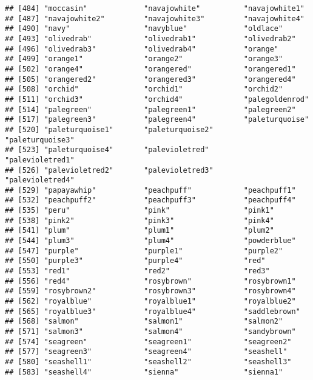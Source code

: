 \documentclass[
]{article}
\begin{document}
\begin{verbatim}
## [484] "moccasin"             "navajowhite"          "navajowhite1"        
## [487] "navajowhite2"         "navajowhite3"         "navajowhite4"        
## [490] "navy"                 "navyblue"             "oldlace"             
## [493] "olivedrab"            "olivedrab1"           "olivedrab2"          
## [496] "olivedrab3"           "olivedrab4"           "orange"              
## [499] "orange1"              "orange2"              "orange3"             
## [502] "orange4"              "orangered"            "orangered1"          
## [505] "orangered2"           "orangered3"           "orangered4"          
## [508] "orchid"               "orchid1"              "orchid2"             
## [511] "orchid3"              "orchid4"              "palegoldenrod"       
## [514] "palegreen"            "palegreen1"           "palegreen2"          
## [517] "palegreen3"           "palegreen4"           "paleturquoise"       
## [520] "paleturquoise1"       "paleturquoise2"       "paleturquoise3"      
## [523] "paleturquoise4"       "palevioletred"        "palevioletred1"      
## [526] "palevioletred2"       "palevioletred3"       "palevioletred4"      
## [529] "papayawhip"           "peachpuff"            "peachpuff1"          
## [532] "peachpuff2"           "peachpuff3"           "peachpuff4"          
## [535] "peru"                 "pink"                 "pink1"               
## [538] "pink2"                "pink3"                "pink4"               
## [541] "plum"                 "plum1"                "plum2"               
## [544] "plum3"                "plum4"                "powderblue"          
## [547] "purple"               "purple1"              "purple2"             
## [550] "purple3"              "purple4"              "red"                 
## [553] "red1"                 "red2"                 "red3"                
## [556] "red4"                 "rosybrown"            "rosybrown1"          
## [559] "rosybrown2"           "rosybrown3"           "rosybrown4"          
## [562] "royalblue"            "royalblue1"           "royalblue2"          
## [565] "royalblue3"           "royalblue4"           "saddlebrown"         
## [568] "salmon"               "salmon1"              "salmon2"             
## [571] "salmon3"              "salmon4"              "sandybrown"          
## [574] "seagreen"             "seagreen1"            "seagreen2"           
## [577] "seagreen3"            "seagreen4"            "seashell"            
## [580] "seashell1"            "seashell2"            "seashell3"           
## [583] "seashell4"            "sienna"               "sienna1"             

\end{verbatim}
\end{document}

